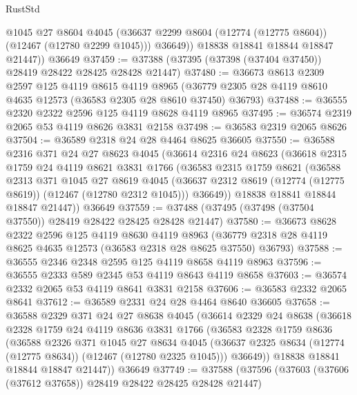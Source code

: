 \begin{lexlean}{RustStd}
\begin{coremodule}
            @1045
            @27
            @8604
            @4045
            (@36637 @2299 @8604 (@12774 (@12775 @8604)) (@12467 (@12780 @2299 @1045)))
            @36649))
        @18838
        @18841
        @18844
        @18847
        @21447))
    @36649
@37459 := @37388 (@37395 (@37398 (@37404 @37450)) @28419 @28422 @28425 @28428 @21447)
@37480 := @36673
    @8613
    @2309
    @2597
    @125
    @4119
    @8615
    @4119
    @8965
    (@36779 @2305 @28 @4119 @8610 @4635 @12573 (@36583 @2305 @28 @8610 @37450) @36793)
@37488 := @36555 @2320 @2322 @2596 @125 @4119 @8628 @4119 @8965
@37495 := @36574 @2319 @2065 @53 @4119 @8626 @3831 @2158
@37498 := @36583 @2319 @2065 @8626
@37504 := @36589 @2318 @24 @28 @4464 @8625 @36605
@37550 := @36588
    @2316
    @371
    @24
    @27
    @8623
    @4045
    (@36614
      @2316
      @24
      @8623
      (@36618
        @2315
        @1759
        @24
        @4119
        @8621
        @3831
        @1766
        (@36583
          @2315
          @1759
          @8621
          (@36588
            @2313
            @371
            @1045
            @27
            @8619
            @4045
            (@36637 @2312 @8619 (@12774 (@12775 @8619)) (@12467 (@12780 @2312 @1045)))
            @36649))
        @18838
        @18841
        @18844
        @18847
        @21447))
    @36649
@37559 := @37488 (@37495 (@37498 (@37504 @37550)) @28419 @28422 @28425 @28428 @21447)
@37580 := @36673
    @8628
    @2322
    @2596
    @125
    @4119
    @8630
    @4119
    @8963
    (@36779 @2318 @28 @4119 @8625 @4635 @12573 (@36583 @2318 @28 @8625 @37550) @36793)
@37588 := @36555 @2346 @2348 @2595 @125 @4119 @8658 @4119 @8963
@37596 := @36555 @2333 @589 @2345 @53 @4119 @8643 @4119 @8658
@37603 := @36574 @2332 @2065 @53 @4119 @8641 @3831 @2158
@37606 := @36583 @2332 @2065 @8641
@37612 := @36589 @2331 @24 @28 @4464 @8640 @36605
@37658 := @36588
    @2329
    @371
    @24
    @27
    @8638
    @4045
    (@36614
      @2329
      @24
      @8638
      (@36618
        @2328
        @1759
        @24
        @4119
        @8636
        @3831
        @1766
        (@36583
          @2328
          @1759
          @8636
          (@36588
            @2326
            @371
            @1045
            @27
            @8634
            @4045
            (@36637 @2325 @8634 (@12774 (@12775 @8634)) (@12467 (@12780 @2325 @1045)))
            @36649))
        @18838
        @18841
        @18844
        @18847
        @21447))
    @36649
@37749 := @37588
    (@37596
      (@37603 (@37606 (@37612 @37658)) @28419 @28422 @28425 @28428 @21447)

\end{coremodule}
\end{lexlean}
